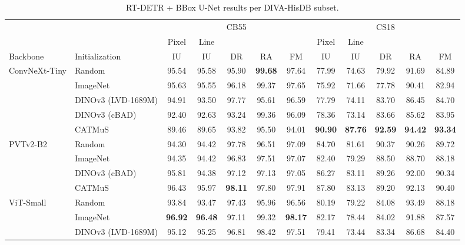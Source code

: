 \begin{table}[htbp]
    \centering
    \scriptsize
    \setlength{\tabcolsep}{1.3pt}
    \renewcommand{\arraystretch}{0.92}
    \caption{RT-DETR + BBox U-Net results per DIVA-HisDB subset.}
    \label{tab:rq1-rtdetr-diva-subsets}\label{tab:rq1-rtdetr-diva-average}
    \begin{tabular*}{\textwidth}{@{\extracolsep{\fill}}ll*{10}{c}@{}}
        \toprule
        & & \multicolumn{5}{c}{CB55} & \multicolumn{5}{c}{CS18} \\
        \cmidrule(lr){3-7}\cmidrule(l){8-12}
        & & Pixel & Line & & & & Pixel & Line & & & \\
        Backbone & Initialization & IU & IU & DR & RA & FM & IU & IU & DR & RA & FM \\
        \midrule
        ConvNeXt-Tiny & Random & 95.54 & 95.58 & 95.90 & \textbf{99.68} & 97.64 & 77.99 & 74.63 & 79.92 & 91.69 & 84.89 \\
         & ImageNet & 95.63 & 95.55 & 96.18 & 99.37 & 97.65 & 75.92 & 71.66 & 77.78 & 90.41 & 82.94 \\
         & DINOv3 (LVD-1689M) & 94.91 & 93.50 & 97.77 & 95.61 & 96.59 & 77.79 & 74.11 & 83.70 & 86.45 & 84.70 \\
         & DINOv3 (cBAD) & 92.40 & 92.63 & 93.24 & 99.36 & 96.09 & 78.36 & 73.14 & 83.66 & 85.62 & 83.95 \\
         & CATMuS & 89.46 & 89.65 & 93.82 & 95.50 & 94.01 & \textbf{90.90} & \textbf{87.76} & \textbf{92.59} & \textbf{94.42} & \textbf{93.34} \\
        \addlinespace[1pt]
        PVTv2-B2 & Random & 94.30 & 94.42 & 97.78 & 96.51 & 97.09 & 84.70 & 81.61 & 90.37 & 90.26 & 89.72 \\
         & ImageNet & 94.35 & 94.42 & 96.83 & 97.51 & 97.07 & 82.40 & 79.29 & 88.50 & 88.70 & 88.18 \\
         & DINOv3 (cBAD) & 95.81 & 94.38 & 97.12 & 97.13 & 97.05 & 86.27 & 83.11 & 89.26 & 92.00 & 90.34 \\
         & CATMuS & 96.43 & 95.97 & \textbf{98.11} & 97.80 & 97.91 & 87.80 & 83.13 & 89.20 & 92.13 & 90.40 \\
        \addlinespace[1pt]
        ViT-Small & Random & 93.84 & 93.47 & 97.43 & 95.96 & 96.56 & 80.19 & 79.22 & 84.08 & 93.49 & 88.18 \\
         & ImageNet & \textbf{96.92} & \textbf{96.48} & 97.11 & 99.32 & \textbf{98.17} & 82.17 & 78.44 & 84.02 & 91.88 & 87.57 \\
         & DINOv3 (LVD-1689M) & 95.12 & 95.25 & 96.81 & 98.42 & 97.51 & 79.41 & 73.44 & 83.34 & 86.68 & 84.40 \\

\end{tabular*}
\end{table}
